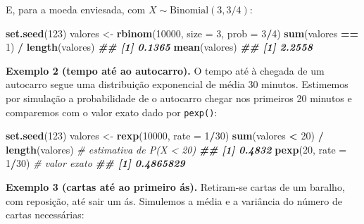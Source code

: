 \documentclass[
  portuguese,
  11pt,
  openany]{book}
\newenvironment{Shaded}{\begin{snugshade}}{\end{snugshade}}
\newcommand{\AttributeTok}[1]{\textcolor[rgb]{0.13,0.29,0.53}{#1}}
\newcommand{\CommentTok}[1]{\textcolor[rgb]{0.56,0.35,0.01}{\textit{#1}}}
\newcommand{\DecValTok}[1]{\textcolor[rgb]{0.00,0.00,0.81}{#1}}
\newcommand{\DocumentationTok}[1]{\textcolor[rgb]{0.56,0.35,0.01}{\textbf{\textit{#1}}}}
\newcommand{\FunctionTok}[1]{\textcolor[rgb]{0.13,0.29,0.53}{\textbf{#1}}}
\newcommand{\NormalTok}[1]{#1}
\newcommand{\OtherTok}[1]{\textcolor[rgb]{0.56,0.35,0.01}{#1}}
\newcommand{\SpecialCharTok}[1]{\textcolor[rgb]{0.81,0.36,0.00}{\textbf{#1}}}
\begin{document}
E, para a moeda enviesada, com \(X \sim \text{Binomial}(3, 3/4)\):

\begin{Shaded}
\begin{Highlighting}[]
\FunctionTok{set.seed}\NormalTok{(}\DecValTok{123}\NormalTok{)}
\NormalTok{valores }\OtherTok{\textless{}{-}} \FunctionTok{rbinom}\NormalTok{(}\DecValTok{10000}\NormalTok{, }\AttributeTok{size =} \DecValTok{3}\NormalTok{, }\AttributeTok{prob =} \DecValTok{3}\SpecialCharTok{/}\DecValTok{4}\NormalTok{)}
\FunctionTok{sum}\NormalTok{(valores }\SpecialCharTok{==} \DecValTok{1}\NormalTok{) }\SpecialCharTok{/} \FunctionTok{length}\NormalTok{(valores)}
\DocumentationTok{\#\# [1] 0.1365}
\FunctionTok{mean}\NormalTok{(valores)}
\DocumentationTok{\#\# [1] 2.2558}
\end{Highlighting}
\end{Shaded}

\textbf{Exemplo 2 (tempo até ao autocarro).} O tempo até à chegada de um autocarro segue uma
distribuição exponencial de média 30 minutos. Estimemos por simulação a probabilidade
de o autocarro chegar nos primeiros 20 minutos e comparemos com o valor exato dado por
\texttt{pexp()}:

\begin{Shaded}
\begin{Highlighting}[]
\FunctionTok{set.seed}\NormalTok{(}\DecValTok{123}\NormalTok{)}
\NormalTok{valores }\OtherTok{\textless{}{-}} \FunctionTok{rexp}\NormalTok{(}\DecValTok{10000}\NormalTok{, }\AttributeTok{rate =} \DecValTok{1}\SpecialCharTok{/}\DecValTok{30}\NormalTok{)}
\FunctionTok{sum}\NormalTok{(valores }\SpecialCharTok{\textless{}} \DecValTok{20}\NormalTok{) }\SpecialCharTok{/} \FunctionTok{length}\NormalTok{(valores)   }\CommentTok{\# estimativa de P(X \textless{} 20)}
\DocumentationTok{\#\# [1] 0.4832}
\FunctionTok{pexp}\NormalTok{(}\DecValTok{20}\NormalTok{, }\AttributeTok{rate =} \DecValTok{1}\SpecialCharTok{/}\DecValTok{30}\NormalTok{)                  }\CommentTok{\# valor exato}
\DocumentationTok{\#\# [1] 0.4865829}
\end{Highlighting}
\end{Shaded}

\textbf{Exemplo 3 (cartas até ao primeiro ás).} Retiram-se cartas de um baralho, com
reposição, até sair um ás. Simulemos a média e a variância do número de cartas
necessárias:
\end{document}
